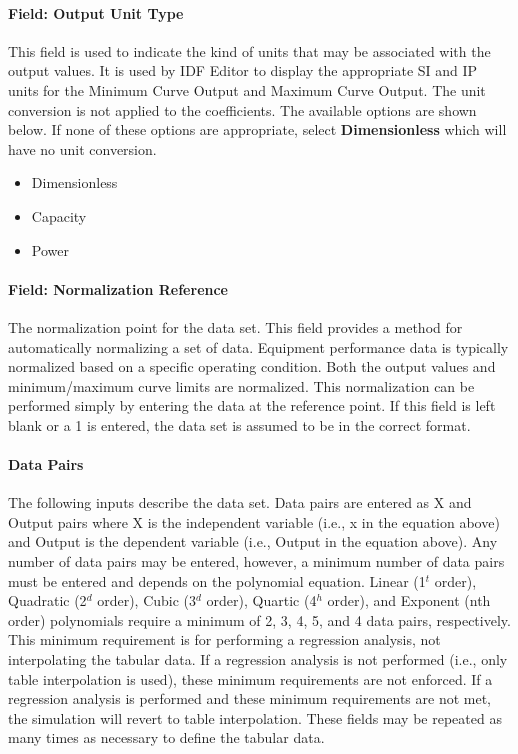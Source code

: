 \paragraph{Field: Output Unit Type}\label{field-output-unit-type-000}

This field is used to indicate the kind of units that may be associated with the output values. It is used by IDF Editor to display the appropriate SI and IP units for the Minimum Curve Output and Maximum Curve Output. The unit conversion is not applied to the coefficients. The available options are shown below. If none of these options are appropriate, select \textbf{Dimensionless} which will have no unit conversion.

\begin{itemize}
\item
  Dimensionless
\item
  Capacity
\item
  Power
\end{itemize}

\paragraph{Field: Normalization Reference}\label{field-normalization-reference}

The normalization point for the data set. This field provides a method for automatically normalizing a set of data. Equipment performance data is typically normalized based on a specific operating condition. Both the output values and minimum/maximum curve limits are normalized. This normalization can be performed simply by entering the data at the reference point. If this field is left blank or a 1 is entered, the data set is assumed to be in the correct format.

\paragraph{Data Pairs}\label{data-pairs}

The following inputs describe the data set. Data pairs are entered as X and Output pairs where X is the independent variable (i.e., x in the equation above) and Output is the dependent variable (i.e., Output in the equation above). Any number of data pairs may be entered, however, a minimum number of data pairs must be entered and depends on the polynomial equation. Linear (1\(^{t}\) order), Quadratic (2\(^{d}\) order), Cubic (3\(^{d}\) order), Quartic (4\(^{h}\) order), and Exponent (nth order) polynomials require a minimum of 2, 3, 4, 5, and 4 data pairs, respectively. This minimum requirement is for performing a regression analysis, not interpolating the tabular data. If a regression analysis is not performed (i.e., only table interpolation is used), these minimum requirements are not enforced. If a regression analysis is performed and these minimum requirements are not met, the simulation will revert to table interpolation. These fields may be repeated as many times as necessary to define the tabular data.

